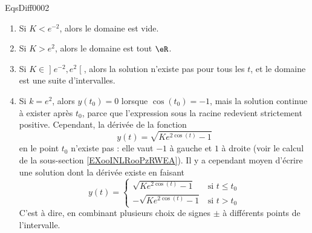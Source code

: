 \begin{corrige}{EqsDiff0002}
\begin{enumerate}
\begin{enumerate}
\item
Si $K<e^{-2}$, alors le domaine est vide.
\item
Si $K>e^2$, alors le domaine est tout $\eR$.
\item
Si $K\in\mathopen]e^{-2},e^2\mathclose[$, alors la solution n'existe pas pour tous les $t$, et le domaine est une suite d'intervalles.
\item
Si $k=e^2$, alors $y(t_0)=0$ lorsque $\cos(t_0)=-1$, mais la solution continue à exister après $t_0$, parce que l'expression sous la racine redevient strictement positive. Cependant, la dérivée de la fonction
\begin{equation}
	y(t)=\sqrt{K e^{2\cos(t)}-1}
\end{equation}
en le point $t_0$ n'existe pas  : elle vaut $-1$ à gauche et $1$ à droite (voir le calcul de la sous-section \ref{EXooINLRooPzRWEA}). Il y a cependant moyen d'écrire une solution dont la dérivée existe en faisant
\begin{equation}
	y(t)=\begin{cases}
	\sqrt{Ke^{2\cos(t)}-1}	&	\text{si }t\leq t_0\\
	-\sqrt{Ke^{2\cos(t)}-1}		&	 \text{si }t> t_0
\end{cases}
\end{equation}
C'est à dire, en combinant plusieurs choix de signes $\pm$ à différents points de l'intervalle.

\end{enumerate}
\end{enumerate}

\end{corrige}
